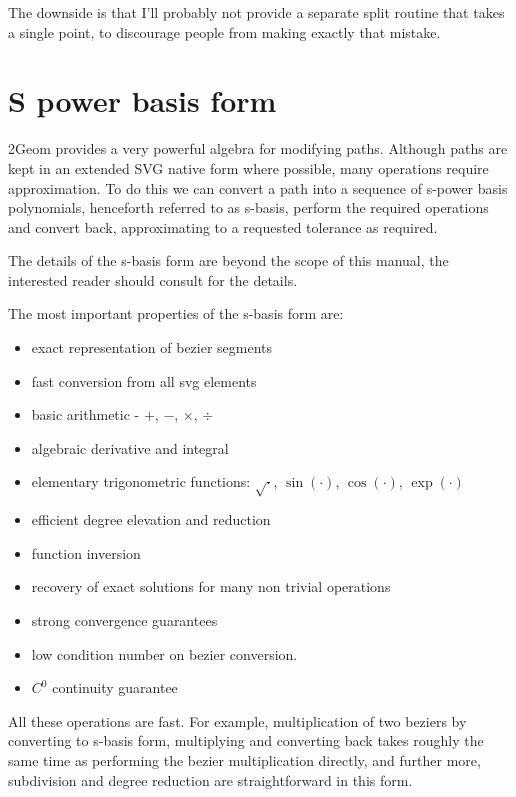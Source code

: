The downside is that I'll probably not provide a separate split
routine that takes a single point, to discourage people from making
exactly that mistake.

\section{S power basis form}

2Geom provides a very powerful algebra for modifying paths.  Although
paths are kept in an extended SVG native form where possible, many
operations require approximation.  To do this we can convert a path
into a sequence of s-power basis polynomials, henceforth referred to
as s-basis, perform the required operations and convert back,
approximating to a requested tolerance as required.

The details of the s-basis form are beyond the scope of this manual,
the interested reader should consult \cite{SanchezReyes1997,SanchezReyes2000,SanchezReyes2001,SanchezReyes2003,SanchezReyes2004} for the details.

The most important properties of the s-basis form are:
\begin{itemize}
\item exact representation of bezier segments
\item fast conversion from all svg elements
\item basic arithmetic - $+$, $-$, $\times$, $\div$
\item algebraic derivative and integral
\item elementary trigonometric functions: $\sqrt{\cdot}$, $\sin(\cdot)$, $\cos(\cdot)$, $\exp(\cdot)$
\item efficient degree elevation and reduction
\item function inversion
\item recovery of exact solutions for many non trivial operations
\item strong convergence guarantees
\item low condition number on bezier conversion.
\item $C^0$ continuity guarantee
\end{itemize}

All these operations are fast.  For example, multiplication of two
beziers by converting to s-basis form, multiplying and converting back
takes roughly the same time as performing the bezier multiplication
directly, and further more, subdivision and degree reduction are
straightforward in this form.

